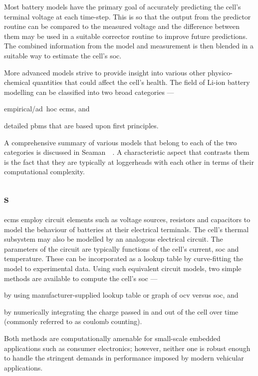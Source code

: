Most battery  models have the primary  goal of accurately predicting  the cell's
terminal  voltage  at each  time-step.  This  is so  that  the  output from  the
predictor routine  can be compared  to the  measured voltage and  the difference
between  them may  be used  in a  suitable corrector  routine to  improve future
predictions. The  combined information  from the model  and measurement  is then
blended in a suitable way to estimate the cell's \gls{soc}.

More   advanced  models   strive   to  provide   insight   into  various   other
physico-chemical quantities  that could affect  the cell's health. The  field of
Li-ion battery modelling can be classified into two broad categories
---
\begin{enumerate*}[label=\roman*)]
    \item empirical/\mbox{ad hoc} \glspl{ecm}, and
    \item detailed  \glspl{pbm} that are based  upon first principles.
\end{enumerate*}
A  comprehensive summary  of  various models  that  belong to  each  of the  two
categories  is  discussed  in Seaman~\etal~\cite{Seaman2014}.  A  characteristic
aspect that contrasts  them is the fact that they  are typically
at loggerheads with each other in terms of their computational complexity.

\subsection{s}\label{subsec:ecms}

\glspl{ecm}  employ circuit  elements  such as  voltage  sources, resistors  and
capacitors to  model the behaviour  of batteries at their  electrical terminals.
The cell's  thermal subsystem may  also be  modelled by an  analogous electrical
circuit. The  parameters of the  circuit are  typically functions of  the cell's
current, \gls{soc} and  temperature. These can be incorporated as  a lookup table by
curve-fitting  the model  to experimental  data. Using  such equivalent  circuit
models, two simple methods are available to compute the cell's \gls{soc} ---
\begin{enumerate*}[label=\itshape\alph*\upshape)]
    \item by using manufacturer-supplied  lookup table or graph of \gls{ocv} versus \gls{soc}, and
    \item by numerically integrating the charge passed in and out of the cell over time (commonly referred to as coulomb counting).
\end{enumerate*}
Both methods are computationally  amenable for small-scale embedded applications
such as  consumer electronics; however, neither  one is robust enough  to handle
the stringent demands in performance imposed by modern vehicular applications.

